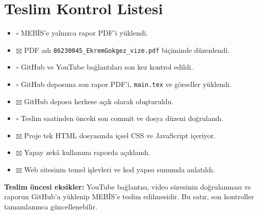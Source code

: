 \documentclass[12pt,a4paper]{article}
\begin{document}
\section{Teslim Kontrol Listesi}
\begin{itemize}[label={}]
\item $\square$ MEBİS'e yalnızca rapor PDF'i yüklendi.
\item $\boxtimes$ PDF adı \texttt{86230045\_EkremGokgez\_vize.pdf} biçiminde düzenlendi.
\item $\square$ GitHub ve YouTube bağlantıları son kez kontrol edildi.
\item $\square$ GitHub deposuna son rapor PDF'i, \texttt{main.tex} ve görseller yüklendi.
\item $\boxtimes$ GitHub deposu herkese açık olarak oluşturuldu.
\item $\square$ Teslim saatinden önceki son commit ve dosya düzeni doğrulandı.
\item $\boxtimes$ Proje tek HTML dosyasında içsel CSS ve JavaScript içeriyor.
\item $\boxtimes$ Yapay zekâ kullanımı raporda açıklandı.
\item $\boxtimes$ Web sitesinin temel işlevleri ve kod yapısı sunumda anlatıldı.
\end{itemize}
\textbf{Teslim öncesi eksikler:} YouTube bağlantısı, video süresinin doğrulanması ve raporun GitHub'a yüklenip MEBİS'e teslim edilmesidir. Bu satır, son kontroller tamamlanınca güncellenebilir.
\end{document}
